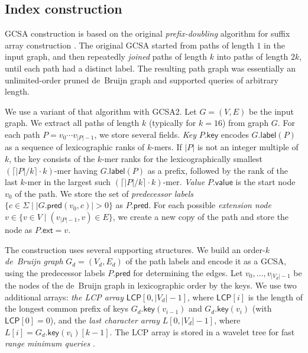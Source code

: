 \documentclass[a4paper,UKenglish]{lipics-v2016}
\newcommand{\set}[1]{\ensuremath{\{ #1 \}}}
\newcommand{\abs}[1]{\ensuremath{\lvert #1 \rvert}}
\newcommand{\glabel}{\ensuremath{\mathsf{label}}}
\newcommand{\gpred}{\ensuremath{\mathsf{pred}}}
\newcommand{\gkey}{\ensuremath{\mathsf{key}}}
\newcommand{\gvalue}{\ensuremath{\mathsf{value}}}
\newcommand{\gext}{\ensuremath{\mathsf{ext}}}
\newcommand{\kmer}[1]{$#1$\nobreakdash-mer}
\newcommand{\orderk}[1]{order\nobreakdash-$#1$}
\newcommand{\LCP}{\ensuremath{\mathsf{LCP}}}
\begin{document}
\subsection{Index construction}

GCSA construction \cite{Siren2014} is based on the original \emph{prefix-doubling} algorithm for suffix array construction \cite{Manber1993}. The original GCSA started from paths of length $1$ in the input graph, and then repeatedly \emph{joined} paths of length $k$ into paths of length $2k$, until each path had a distinct label. The resulting path graph was essentially an unlimited-order pruned de~Bruijn graph and supported queries of arbitrary length.

We use a variant of that algorithm with GCSA2. Let $G = (V, E)$ be the input graph. We extract all paths of length $k$ (typically for $k = 16$) from graph $G$. For each path $P = v_{0} \dotsm v_{\abs{P}-1}$, we store several fields. \emph{Key} $P.\gkey$ encodes $G.\glabel(P)$ as a sequence of lexicographic ranks of \kmer{k}s. If $\abs{P}$ is not an integer multiple of $k$, the key consists of the \kmer{k} ranks for the lexicographically smallest \kmer{(\lceil \abs{P}/k \rceil \cdot k)} having $G.\glabel(P)$ as a prefix, followed by the rank of the last \kmer{k} in the largest such \kmer{(\lceil \abs{P}/k \rceil \cdot k)}. \emph{Value} $P.\gvalue$ is the start node $v_{0}$ of the path. We store the set of \emph{predecessor labels} $\set{c \in \Sigma \mid \abs{G.\gpred(v_{0}, c)} > 0}$ as $P.\gpred$. For each possible \emph{extension node} $v \in \set{v \in V \mid (v_{\abs{P}-1}, v) \in E}$, we create a new copy of the path and store the node as $P.\gext = v$.

The construction uses several supporting structures. We build an \orderk{k} \emph{de~Bruijn graph} $G_{d} = (V_{d}, E_{d})$ of the path labels and encode it as a GCSA, using the predecessor labels $P.\gpred$ for determining the edges. Let $v_{0}, \dotsc, v_{\abs{V_{d}}-1}$ be the nodes of the de~Bruijn graph in lexicographic order by the keys. We use two additional arrays: \emph{the LCP array} $\LCP[0, \abs{V_{d}}-1]$, where $\LCP[i]$ is the length of the longest common prefix of keys $G_{d}.\gkey(v_{i-1})$ and $G_{d}.\gkey(v_{i})$ (with $\LCP[0] = 0$), and the \emph{last character array} $L[0, \abs{V_{d}}-1]$, where $L[i] = G_{d}.\gkey(v_{i})[k-1]$. The LCP array is stored in a wavelet tree for fast \emph{range minimum queries} \cite{Gagie2012a}.
\end{document}
